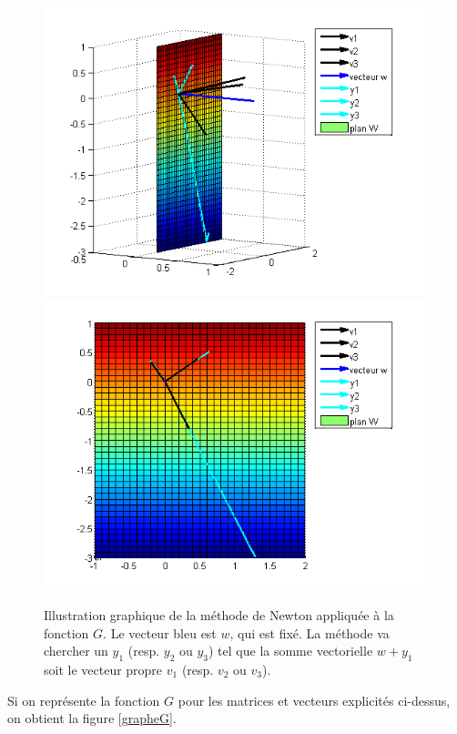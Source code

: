 \begin{figure}
\centering
\includegraphics[width=12cm]{grapheNewton.png}\\
\includegraphics[width=12cm]{grapheNewton2.png}
\caption{Illustration graphique de la méthode de Newton appliquée à la fonction $G$. Le vecteur bleu est $w$, qui est fixé. La méthode va chercher un $y_1$ (resp. $y_2$ ou $y_3$) tel que la somme vectorielle $w+y_1$ soit le vecteur propre $v_1$ (resp. $v_2$ ou $v_3$).}
\label{figureNewton}
\end{figure}

Si on représente la fonction $G$ pour les matrices et vecteurs explicités ci-dessus, on obtient la figure \ref{grapheG}.


